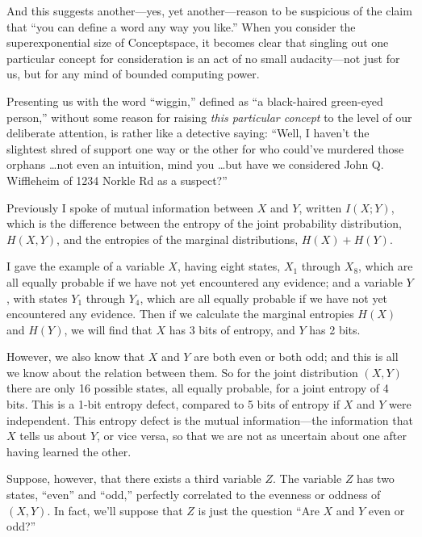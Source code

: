 {
 And this suggests another---yes, yet another---reason to be
suspicious of the claim that ``you can define a word
any way you like.'' When you consider the
superexponential size of Conceptspace, it becomes clear that singling
out one particular concept for consideration is an act of no small
audacity---not just for us, but for any mind of bounded computing
power.}

{
 Presenting us with the word
``wiggin,'' defined as
``a black-haired green-eyed
person,'' without some reason for raising
\textit{this particular concept} to the level of our deliberate
attention, is rather like a detective saying: ``Well,
I haven't the slightest shred of support one way or the
other for who could've murdered those orphans \ldots not
even an intuition, mind you \ldots but have we considered John Q.
Wiffleheim of 1234 Norkle Rd as a suspect?''}

\myendsectiontext


\bigskip


{
 Previously I spoke of mutual information between $X$ and $Y$, written
$I(X;Y)$, which is the difference between the entropy of the joint
probability distribution, $H(X,Y)$, and the entropies of the marginal
distributions, $H(X) + H(Y)$. }

{
 I gave the example of a variable $X$, having eight states,
$X_{1}$ through $X_{8}$, which are all equally
probable if we have not yet encountered any evidence; and a variable $Y$,
with states $Y_{1}$ through $Y_{4}$, which are
all equally probable if we have not yet encountered any evidence. Then
if we calculate the marginal entropies $H(X)$ and $H(Y)$, we will find that
$X$ has 3 bits of entropy, and $Y$ has 2 bits.}

{
 However, we also know that $X$ and $Y$ are both even or both odd; and
this is all we know about the relation between them. So for the joint
distribution $(X,Y)$ there are only 16 possible states, all equally
probable, for a joint entropy of 4 bits. This is a 1-bit entropy
defect, compared to 5 bits of entropy if $X$ and $Y$ were independent. This
entropy defect is the mutual information---the information that $X$ tells
us about $Y$, or vice versa, so that we are not as uncertain about one
after having learned the other.}

{
 Suppose, however, that there exists a third variable $Z$. The
variable $Z$ has two states, ``even''
and ``odd,'' perfectly correlated to
the evenness or oddness of $(X,Y)$. In fact, we'll
suppose that $Z$ is just the question ``Are $X$ and $Y$ even
or odd?''}

